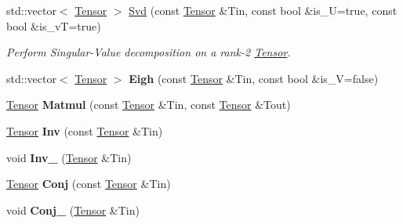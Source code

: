 \begin{DoxyCompactItemize}
\item 
std\+::vector$<$ \hyperlink{classcytnx_1_1Tensor}{Tensor} $>$ \hyperlink{namespacecytnx_1_1linalg_ac17f16959a4849ea91bce712d24d4e4e}{Svd} (const \hyperlink{classcytnx_1_1Tensor}{Tensor} \&Tin, const bool \&is\+\_\+U=true, const bool \&is\+\_\+vT=true)
\begin{DoxyCompactList}\small\item\em Perform Singular-\/\+Value decomposition on a rank-\/2 \hyperlink{classcytnx_1_1Tensor}{Tensor}. \end{DoxyCompactList}\item 
\mbox{\label{namespacecytnx_1_1linalg_aa9f11ed24ef9684fb8d05c228e3852d6}} 
std\+::vector$<$ \hyperlink{classcytnx_1_1Tensor}{Tensor} $>$ {\bfseries Eigh} (const \hyperlink{classcytnx_1_1Tensor}{Tensor} \&Tin, const bool \&is\+\_\+V=false)
\item 
\mbox{\label{namespacecytnx_1_1linalg_ac8c0c688c72225a698b5eec6a47f0c7e}} 
\hyperlink{classcytnx_1_1Tensor}{Tensor} {\bfseries Matmul} (const \hyperlink{classcytnx_1_1Tensor}{Tensor} \&Tin, const \hyperlink{classcytnx_1_1Tensor}{Tensor} \&Tout)
\item 
\mbox{\label{namespacecytnx_1_1linalg_a351ad02f478ba8082ee79a37a2a8f108}} 
\hyperlink{classcytnx_1_1Tensor}{Tensor} {\bfseries Inv} (const \hyperlink{classcytnx_1_1Tensor}{Tensor} \&Tin)
\item 
\mbox{\label{namespacecytnx_1_1linalg_a26628db51e90867ddc050ab11a317a8d}} 
void {\bfseries Inv\+\_\+} (\hyperlink{classcytnx_1_1Tensor}{Tensor} \&Tin)
\item 
\mbox{\label{namespacecytnx_1_1linalg_a470d0886432554a35ecaf961451c0806}} 
\hyperlink{classcytnx_1_1Tensor}{Tensor} {\bfseries Conj} (const \hyperlink{classcytnx_1_1Tensor}{Tensor} \&Tin)
\item 
\mbox{\label{namespacecytnx_1_1linalg_adc3233bf8bc3eb6a435340f912412801}} 
void {\bfseries Conj\+\_\+} (\hyperlink{classcytnx_1_1Tensor}{Tensor} \&Tin)
\item 
\mbox{\label{namespacecytnx_1_1linalg_aac38382cbc0e8202411c96a0ff636471}} 

\end{DoxyCompactItemize}

